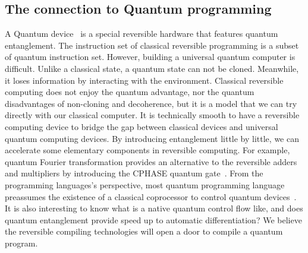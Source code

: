 \documentclass{article}
\newcommand{\<}{\langle}
\renewcommand{\>}{\rangle}
\theoremstyle{definition}\newtheorem{definition}{\textit{Definition}}
\begin{document}
\subsection{The connection to Quantum programming}
A Quantum device~\cite{Nielsen2002} is a special reversible hardware that features quantum entanglement.
The instruction set of classical reversible programming is a subset of quantum instruction set.
However, building a universal quantum computer is difficult. 
Unlike a classical state, a quantum state can not be cloned. Meanwhile, it loses information by interacting with the environment.
Classical reversible computing does not enjoy the quantum advantage, nor the quantum disadvantages of non-cloning and decoherence,
but it is a model that we can try directly with our classical computer.
It is technically smooth to have a reversible computing device to bridge the gap between classical devices and universal quantum computing devices.
By introducing entanglement little by little, we can accelerate some elementary components in reversible computing. For example, quantum Fourier transformation provides an alternative to the reversible adders and multipliers by introducing the CPHASE quantum gate~\cite{RuizPerez2017}.
From the programming languages's perspective, most quantum programming language preassumes the existence of a classical coprocessor to control quantum devices~\cite{Svore2018}.
It is also interesting to know what is a native quantum control flow like, and does quantum entanglement provide speed up to automatic differentiation?
We believe the reversible compiling technologies will open a door to compile a quantum program.
\end{document}
